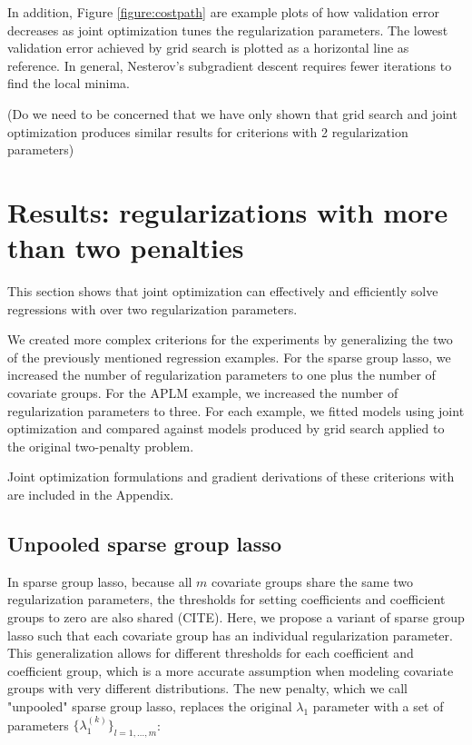 \documentclass[10pt,letterpaper]{article}
\begin{document}
In addition, Figure \ref{figure:costpath} are example plots of how validation error decreases as joint optimization tunes the regularization parameters. The lowest validation error achieved by grid search is plotted as a horizontal line as reference. In general, Nesterov's subgradient descent requires fewer iterations to find the local minima.

(Do we need to be concerned that we have only shown that grid search and joint optimization produces similar results for criterions with 2 regularization parameters)

\section{Results: regularizations with more than two penalties}

This section shows that joint optimization can effectively and efficiently solve regressions with over two regularization parameters.

We created more complex criterions for the experiments by generalizing the two of the previously mentioned regression examples. For the sparse group lasso, we increased the number of regularization parameters to one plus the number of covariate groups. For the APLM example, we increased the number of regularization parameters to three. For each example, we fitted models using joint optimization and compared against models produced by grid search applied to the original two-penalty problem.

Joint optimization formulations and gradient derivations of these criterions with  are included in the Appendix.

\subsection{Unpooled sparse group lasso}

In sparse group lasso, because all $m$ covariate groups share the same two regularization parameters, the thresholds for setting coefficients and coefficient groups to zero are also shared (CITE). Here, we propose a variant of sparse group lasso such that each covariate group has an individual regularization parameter. This generalization allows for different thresholds for each coefficient and coefficient group, which is a more accurate assumption when modeling covariate groups with very different distributions. The new penalty, which we call "unpooled" sparse group lasso, replaces the original $\lambda_1$ parameter with a set of parameters $\{\lambda_1^{(k)}\}_{l=1,...,m}$:
\end{document}

